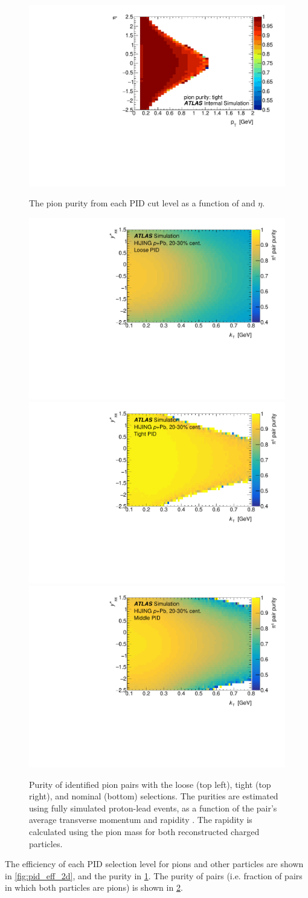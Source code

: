 \begin{figure}[t]
\begin{minipage}[t]{1.0\textwidth}
\includegraphics[width=.49\linewidth]{pid_pur_tight.pdf}\\
\end{minipage}
\caption{The pion purity from each PID cut level as a function of \pt and $\eta$.}
\label{fig:pid_purity_2d}
\end{figure}


\begin{figure}[t]
\centering
\includegraphics[width=.49\linewidth]{pid_pur_loose_kt_eta.pdf}
\includegraphics[width=.49\linewidth]{pid_pur_tight_kt_eta.pdf}\\
\includegraphics[width=.6\linewidth]{pid_pur_mid_kt_eta.pdf}\\
\caption{Purity of identified pion pairs with the loose (top left), tight (top right), and nominal (bottom) \pid selections. The purities are estimated using fully simulated \Hijing proton-lead events, as a function of the pair's average transverse momentum \kt and rapidity \kys. The rapidity is calculated using the pion mass for both reconstructed charged particles.}
\label{fig:pid_purity_kt_eta}
\end{figure}

The efficiency of each PID selection level for pions and other particles are shown in \cref{fig:pid_eff_2d}, and the purity in \cref{fig:pid_purity_2d}.
The purity of pairs (i.e. fraction of pairs in which both particles are pions) is shown in \cref{fig:pid_purity_kt_eta}.

